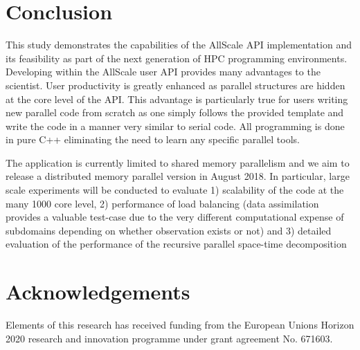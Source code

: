 \documentclass[conference,compsoc]{IEEEtran}
\begin{document}
\section{Conclusion}
This study demonstrates the capabilities of the AllScale API implementation and its feasibility as part of the next generation of HPC programming environments. Developing within the AllScale user API provides many advantages to the scientist. User productivity is greatly enhanced as parallel structures are hidden at the core level of the API. This advantage is particularly true for users writing new parallel code from scratch as one simply follows the provided template and write the code in a manner very similar to serial code. All programming is done in pure C++ eliminating the need to learn any specific parallel tools. 

The application is currently limited to shared memory parallelism and we aim to release a distributed memory parallel version in August 2018. In particular, large scale experiments will be conducted to evaluate 1) scalability of the code at the many 1000 core level, 2) performance of load balancing (data assimilation provides a valuable test-case due to the very different computational expense of subdomains depending on whether observation exists or not) and 3) detailed evaluation of the performance of the recursive parallel space-time decomposition

\section*{Acknowledgements}
Elements of this research has received funding from the European
Unions Horizon 2020 research and innovation programme under grant
agreement No. 671603.
\end{document}
